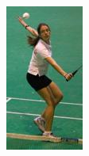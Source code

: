 \begin{figure}[h]
\begin{subfigure}[b]{.15\textwidth}
\end{subfigure}
\begin{subfigure}[b]{.15\textwidth}
	\centering
   \includegraphics[height=4\textwidth / 3]{./images/LSP5}

\end{subfigure}
\end{figure}
